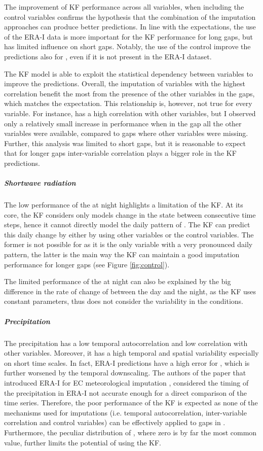 \documentclass{article}
\begin{document}
The improvement of KF performance across all variables, when including the control variables confirms the hypothesis that the combination of the imputation approaches can produce better predictions. In line with the expectations, the use of the ERA-I data is more important for the KF performance for long gaps, but has limited influence on short gaps. Notably, the use of the control improve the predictions also for , even if it is not present in the ERA-I dataset.

The KF model is able to exploit the statistical dependency between variables to improve the predictions. Overall, the imputation of variables with the highest correlation benefit the most from the presence of the other variables in the gaps, which matches the expectation. This relationship is, however, not true for every variable. For instance,  has a high correlation with other variables, but I observed only a relatively small increase in performance when in the gap all the other variables were available, compared to gaps where other variables were missing.
Further, this analysis was limited to short gaps, but it is reasonable to expect that for longer gaps inter-variable correlation plays a bigger role in the KF predictions.

\subparagraph{Shortwave radiation} The low performance of the  at night highlights a limitation of the KF.  At its core, the KF considers only models change in the state between consecutive time steps, hence it cannot directly model the daily pattern of . The KF can predict this daily change by either by using other variables or the control variables. The former is not possible for  as it is the only variable with a very pronounced daily pattern, the latter is the main way the KF can maintain a good imputation performance for longer gaps (see Figure \ref{fig:control}).

The limited performance of the  at night can also be explained by the big difference in the rate of change of  between the day and the night, as the KF uses constant parameters, thus does not consider the variability in the  conditions.

\subparagraph{Precipitation} The precipitation has a low temporal autocorrelation and low correlation with other variables. Moreover, it has a high temporal and spatial variability \cite{mital_sequential_2020} especially on short time scales. In fact, ERA-I predictions have a high error for , which is further worsened by the temporal downscaling. The authors of the paper that introduced ERA-I for EC meteorological imputation \cite{vuichard_filling_2015}, considered the timing of the precipitation in ERA-I not accurate enough for a direct comparison of the time series.
Therefore, the poor performance of the KF is expected as none of the mechanisms used for imputations (i.e. temporal autocorrelation, inter-variable correlation and control variables) can be effectively applied to gaps in . Furthermore, the peculiar distribution of , where zero is by far the most common value, further limits the potential of using the KF.
\end{document}
